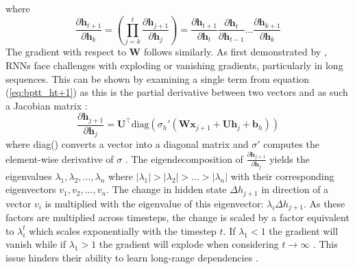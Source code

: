 \documentclass[12pt, a4paper, headinclude, twoside, plainheadsepline, open=right, numbers=noenddot, hidelinks, toc=listof, toc=bibliography]{scrreprt}
\begin{document}
where
\begin{equation}
\label{eq:bptt_ht+1}
\frac{\partial \mathbf{h}_{t+1}}{\partial \mathbf{h}_k} 
= 
\left(\prod_{j=k}^{t}\frac{\partial \mathbf{h}_{j+1}}{\partial \mathbf{h}_j}\right)
=
\frac{\partial \mathbf{h}_{t+1}}{\partial \mathbf{h}_t}
\frac{\partial \mathbf{h}_{t}}{\partial \mathbf{h}_{t-1}}
 . . . 
\frac{\partial \mathbf{h}_{k+1}}{\partial \mathbf{h}_k}   
\end{equation}
The gradient with respect to $\mathbf{W}$ follows similarly.
As first demonstrated by \citeauthor{bengioLearningLongtermDependencies1994} \cite{bengioLearningLongtermDependencies1994}, RNNs face challenges with exploding or vanishing gradients, particularly in long sequences.
This can be shown by examining a single term from equation (\ref{eq:bptt_ht+1}) as this is the partial derivative between two vectors and as such a Jacobian matrix :
\begin{equation}
\label{eq:bptt_jacobian}
\frac{\partial \mathbf{h}_{j+1}}{\partial \mathbf{h}_j}
= 
\mathbf{U}^{\top} \text{diag}(\sigma_{h}' (\mathbf{W} \mathbf{x}_{j+1} + \mathbf{U} \mathbf{h}_j + \mathbf{b}_h))
\end{equation}
where diag() converts a vector into a diagonal matrix and $\sigma '$ computes the element-wise derivative of $\sigma$
\cite{pascanuDifficultyTrainingRecurrent2013}.
The eigendecomposition of $\frac{\partial \mathbf{h}_{j+1}}{\partial \mathbf{h}_j}$ yields the eigenvalues $ \lambda_1, \lambda_2, ..., \lambda_n$ where $|\lambda_1| > |\lambda_2| > ... > |\lambda_n|$ with their corresponding eigenvectors $v_1, v_2, ..., v_n$.
The change in hidden state $\Delta h_{j+1}$ in direction of a vector $v_i$ is multiplied with the eigenvalue of this eigenvector: $\lambda_i \Delta h_{j+1}$.
As these factors are multiplied across timesteps, the change is scaled by a factor equivalent to $\lambda_i^t$ which scales exponentially with the timestep $t$.
If $\lambda_1 < 1$ the gradient will vanish while if $\lambda_1 > 1$ the gradient will explode when considering $t \to \infty$ \cite{pascanuDifficultyTrainingRecurrent2013}.
This issue hinders their ability to learn long-range dependencies \cite{sutskeverTrainingRecurrentNeural2013}. 
\end{document}
